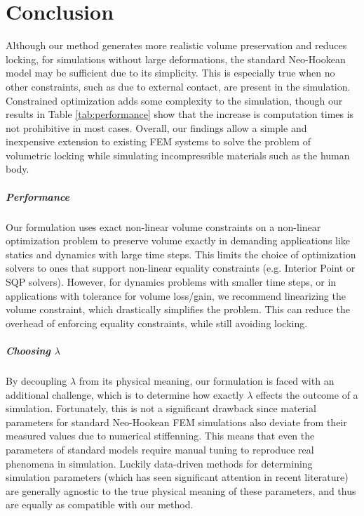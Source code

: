 \chapter{Conclusion}
\label{ch:Conclusion}

Although our method generates more realistic volume preservation and
reduces locking, for simulations without large deformations, the
standard Neo-Hookean model may be sufficient due to its
simplicity. This is especially true when no other constraints, such as due to external contact, are present in the simulation. Constrained optimization adds
some complexity to the simulation, though our results in Table
\ref{tab:performance} show that the increase is computation times is
not prohibitive in most cases. Overall, our findings allow a simple and inexpensive
extension to existing FEM systems to solve the problem of volumetric
locking while simulating incompressible materials such as the human
body.

\paragraph{Performance} Our formulation uses exact non-linear volume constraints on a non-linear
optimization problem to preserve volume exactly in demanding applications like statics and dynamics
with large time steps.  This limits the choice of optimization solvers to ones that
support non-linear equality constraints (e.g. Interior Point or SQP solvers).  However, for dynamics problems
with smaller time steps, or in applications with tolerance for volume loss/gain, we recommend
linearizing the volume constraint, which drastically simplifies the problem. This can reduce the
overhead of enforcing equality constraints, while still avoiding locking.

\paragraph{Choosing $\lambda$} By decoupling $\lambda$ from its physical meaning, our formulation is
faced with an additional challenge, which is to determine how exactly $\lambda$ effects the outcome
of a simulation.  Fortunately, this is not a significant drawback since material parameters for
standard Neo-Hookean FEM simulations also deviate from their measured values due to numerical
stiffenning. This means that even the parameters of standard models require manual tuning to
reproduce real phenomena in simulation.  Luckily data-driven methods for determining simulation
parameters (which has seen significant attention in recent literature) are generally agnostic to the
true physical meaning of these parameters, and thus are equally as compatible with our method.

